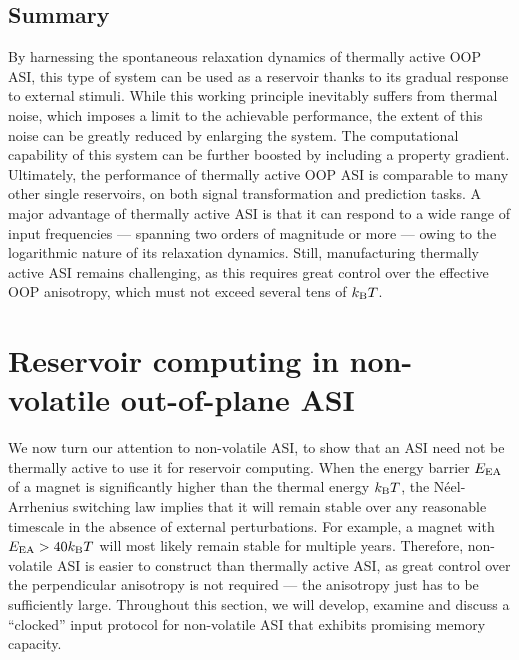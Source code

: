 \subsection{Summary}
By harnessing the spontaneous relaxation dynamics of thermally active OOP ASI, this type of system can be used as a reservoir thanks to its gradual response to external stimuli.
While this working principle inevitably suffers from thermal noise, which imposes a limit to the achievable performance, the extent of this noise can be greatly reduced by enlarging the system.
The computational capability of this system can be further boosted by including a property gradient.
Ultimately, the performance of thermally active OOP ASI is comparable to many other single reservoirs, on both signal transformation and prediction tasks.
A major advantage of thermally active ASI is that it can respond to a wide range of input frequencies --- spanning two orders of magnitude or more --- owing to the logarithmic nature of its relaxation dynamics.
Still, manufacturing thermally active ASI remains challenging, as this requires great control over the effective OOP anisotropy, which must not exceed several tens of $\kBT$.


\newpage
\section{Reservoir computing in non-volatile out-of-plane ASI}
We now turn our attention to non-volatile ASI, to show that an ASI need not be thermally active to use it for reservoir computing. %
When the energy barrier $E_\mathrm{EA}$ of a magnet is significantly higher than the thermal energy $\kBT$, the N\'eel-Arrhenius switching law implies that it will remain stable over any reasonable timescale in the absence of external perturbations.
For example, a magnet with $\EEA > 40 \kBT$ will most likely remain stable for multiple years.
Therefore, non-volatile ASI is easier to construct than thermally active ASI, as great control over the perpendicular anisotropy is not required --- the anisotropy just has to be sufficiently large.
Throughout this section, we will develop, examine and discuss a ``clocked'' input protocol for non-volatile ASI that exhibits promising memory capacity.

